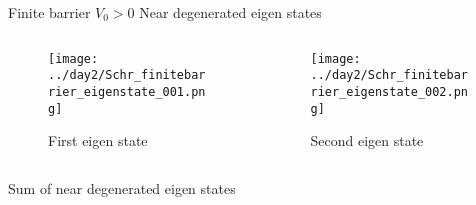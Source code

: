 \documentclass[aspectratio=169]{beamer}
\begin{document}
\begin{frame}{Finite barrier $V_0 > 0$}
    Near degenerated eigen states
    \begin{columns}
        \begin{column}{0.5\textwidth}
            \centering 
            \begin{figure}
            \texttt{[image: ../day2/Schr\_finitebarrier\_eigenstate\_001.png]} \\
            \caption{First eigen state} 
            \end{figure}
        \end{column}

        \begin{column}{0.5\textwidth}
            \centering 
            \begin{figure}
            \texttt{[image: ../day2/Schr\_finitebarrier\_eigenstate\_002.png]} \\
            \caption{Second eigen state} 
            \end{figure}
        \end{column}
    \end{columns}
\end{frame}

\begin{frame}{Sum of near degenerated eigen states}
    \centering
\end{frame}
\end{document}
